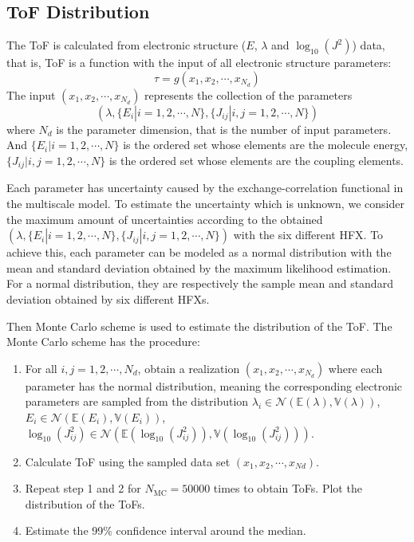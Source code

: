 \documentclass[%
 reprint,
superscriptaddress,
 amsmath,amssymb,
 aps,
prb,
floatfix
]{revtex4-2}
\begin{document}
\subsection{ToF Distribution}
The ToF is calculated from electronic structure ($E$, $\lambda$ and $\log_{10}(J^2)$) data, that is, ToF is a function with the input of all electronic structure parameters:
\begin{equation}
    \tau = g(x_1, x_2, \cdots, x_{N_d})
    \label{eq:tau1}
\end{equation}
The input $(x_1, x_2, \cdots, x_{N_d})$ represents the collection of the parameters $$(\lambda, \{E_i|i=1,2,\cdots,N \}, \{J_{ij}|i,j=1,2,\cdots,N \})$$  where $N_d$ is the parameter dimension, that is the number of input parameters. 
And $\{E_i|i=1,2,\cdots,N \}$ is the ordered set whose elements are the molecule energy,
$\{J_{ij}|i,j=1,2,\cdots,N \}$ is the ordered set whose elements are the coupling elements. 

Each parameter has uncertainty caused by the exchange-correlation functional in the multiscale model.
To estimate the uncertainty which is unknown, we consider the maximum amount of uncertainties according to the obtained $(\lambda, \{E_i|i=1,2,\cdots,N \}, \{J_{ij}|i,j=1,2,\cdots,N \})$ with the six different HFX.
To achieve this, each parameter can be modeled as a normal distribution with the mean and standard deviation obtained by the maximum likelihood estimation. For a normal distribution, they are respectively the sample mean and standard deviation obtained by six different HFXs.

Then Monte Carlo scheme is used to estimate the distribution of the ToF. The Monte Carlo scheme has the procedure:
\begin{enumerate}
\item For all $i,j=1,2,\cdots, N_d$, obtain a realization $(x_1, x_2, \cdots, x_{N_d})$ where each parameter has the normal distribution, meaning the corresponding electronic parameters are sampled from the distribution $\lambda_i \in \mathcal{N}(\mathbb{E}(\lambda), \mathbb{V}(\lambda))$, $E_i \in \mathcal{N}(\mathbb{E}(E_i), \mathbb{V}(E_i))$, $\log_{10}(J_{ij}^2) \in \mathcal{N}(\mathbb{E}(\log_{10}(J_{ij}^2)), \mathbb{V}(\log_{10}(J_{ij}^2)))$. 
\item Calculate ToF using the sampled data set $(x_1, x_2, \cdots, x_{Nd})$. 
\item Repeat step 1 and 2 for $N_\text{MC} = 50000$ times to obtain ToFs. Plot the distribution of the ToFs.
\item Estimate the 99\% confidence interval around the median.
\end{enumerate}
\end{document}

